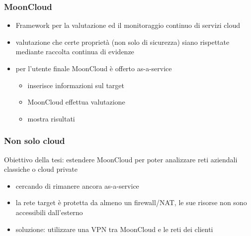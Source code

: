 \begin{frame}
    \frametitle{MoonCloud}
    \begin{itemize}
        \item Framework per la \alert{valutazione}
        ed il \alert{monitoraggio continuo} di servizi
        cloud
        \item valutazione che certe proprietà (non solo di sicurezza)
        siano rispettate
        mediante \alert{raccolta continua di evidenze}
        \item per l'utente finale MoonCloud è offerto \alert{as-a-service}
        \begin{itemize}
            \item inserisce informazioni sul target
            \item MoonCloud effettua valutazione
            \item mostra risultati
        \end{itemize}
    \end{itemize}
\end{frame}

\begin{frame}
    \frametitle{Non solo cloud}
    \alert{Obiettivo} della tesi: estendere MoonCloud per poter analizzare
    reti aziendali classiche o cloud private

        \begin{itemize}
            \item cercando di rimanere ancora \alert{as-a-service} 
            \item la rete target è protetta da almeno un firewall/NAT, le sue
            risorse non sono accessibili dall'esterno
            \item soluzione: utilizzare una \alert{VPN} tra MoonCloud e le reti dei
            clienti
        \end{itemize}
\end{frame}

